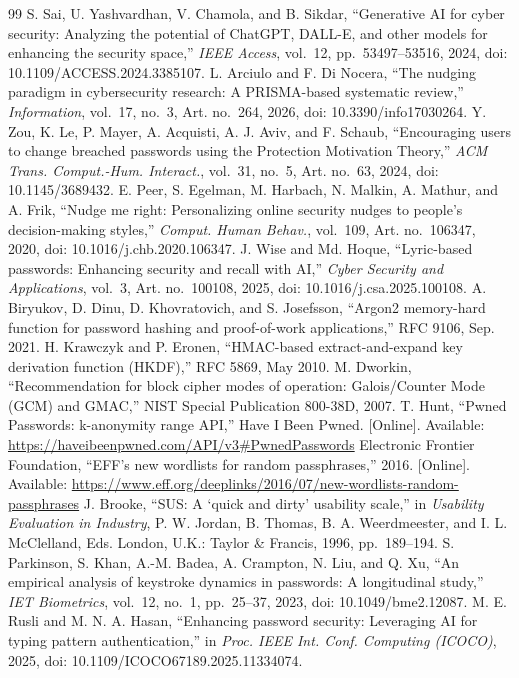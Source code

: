 \documentclass[preprint,12pt]{elsarticle}
\begin{document}
\begin{thebibliography}{99}
 S. Sai, U. Yashvardhan, V. Chamola, and B. Sikdar, ``Generative AI for cyber security: Analyzing the potential of ChatGPT, DALL-E, and other models for enhancing the security space,'' \emph{IEEE Access}, vol.~12, pp.~53497--53516, 2024, doi: 10.1109/ACCESS.2024.3385107.
 L. Arciulo and F. Di Nocera, ``The nudging paradigm in cybersecurity research: A PRISMA-based systematic review,'' \emph{Information}, vol.~17, no.~3, Art. no.~264, 2026, doi: 10.3390/info17030264.
 Y. Zou, K. Le, P. Mayer, A. Acquisti, A. J. Aviv, and F. Schaub, ``Encouraging users to change breached passwords using the Protection Motivation Theory,'' \emph{ACM Trans. Comput.-Hum. Interact.}, vol.~31, no.~5, Art. no.~63, 2024, doi: 10.1145/3689432.
 E. Peer, S. Egelman, M. Harbach, N. Malkin, A. Mathur, and A. Frik, ``Nudge me right: Personalizing online security nudges to people's decision-making styles,'' \emph{Comput. Human Behav.}, vol.~109, Art. no.~106347, 2020, doi: 10.1016/j.chb.2020.106347.
 J. Wise and Md. Hoque, ``Lyric-based passwords: Enhancing security and recall with AI,'' \emph{Cyber Security and Applications}, vol.~3, Art. no.~100108, 2025, doi: 10.1016/j.csa.2025.100108.
 A. Biryukov, D. Dinu, D. Khovratovich, and S. Josefsson, ``Argon2 memory-hard function for password hashing and proof-of-work applications,'' RFC 9106, Sep. 2021.
 H. Krawczyk and P. Eronen, ``HMAC-based extract-and-expand key derivation function (HKDF),'' RFC 5869, May 2010.
 M. Dworkin, ``Recommendation for block cipher modes of operation: Galois/Counter Mode (GCM) and GMAC,'' NIST Special Publication 800-38D, 2007.
 T. Hunt, ``Pwned Passwords: k-anonymity range API,'' Have I Been Pwned. [Online]. Available: \url{https://haveibeenpwned.com/API/v3#PwnedPasswords}
 Electronic Frontier Foundation, ``EFF's new wordlists for random passphrases,'' 2016. [Online]. Available: \url{https://www.eff.org/deeplinks/2016/07/new-wordlists-random-passphrases}
 J. Brooke, ``SUS: A `quick and dirty' usability scale,'' in \emph{Usability Evaluation in Industry}, P. W. Jordan, B. Thomas, B. A. Weerdmeester, and I. L. McClelland, Eds. London, U.K.: Taylor \& Francis, 1996, pp.~189--194.
 S. Parkinson, S. Khan, A.-M. Badea, A. Crampton, N. Liu, and Q. Xu, ``An empirical analysis of keystroke dynamics in passwords: A longitudinal study,'' \emph{IET Biometrics}, vol.~12, no.~1, pp.~25--37, 2023, doi: 10.1049/bme2.12087.
 M. E. Rusli and M. N. A. Hasan, ``Enhancing password security: Leveraging AI for typing pattern authentication,'' in \emph{Proc. IEEE Int. Conf. Computing (ICOCO)}, 2025, doi: 10.1109/ICOCO67189.2025.11334074.
\end{thebibliography}
\end{document}
